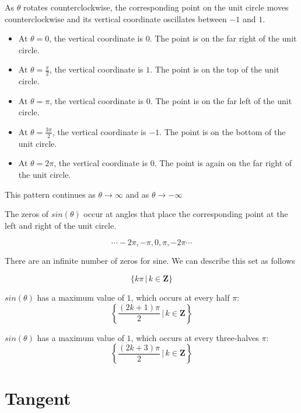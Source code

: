 \documentclass{ximera}
\begin{document}
As $\theta$ rotates counterclockwise, the corresponding point on the unit circle moves counterclockwise and its vertical coordinate oscillates between $-1$ and $1$.

\begin{itemize}
\item At $\theta = 0$, the vertical coordinate is $0$. The point is on the far right of the unit circle.
\item At $\theta = \frac{\pi}{2}$, the vertical coordinate is $1$. The point is on the top of the unit circle.
\item At $\theta = \pi$, the vertical coordinate is $0$. The point is on the far left of the unit circle.
\item At $\theta = \frac{3\pi}{2}$, the vertical coordinate is $-1$. The point is on the bottom of the unit circle.
\item At $\theta = 2\pi$, the vertical coordinate is $0$. The point is again on the far right of the unit circle.
\end{itemize}


This pattern continues as $\theta \rightarrow \infty$ and as $\theta \rightarrow -\infty$

The zeros of $sin(\theta)$ occur at angles that place the corresponding point at the left and right of the unit circle.  


\[     \cdots -2\pi, -\pi, 0, \pi, -2\pi \cdots \]


There are an infinite number of zeros for sine.  We can describe this set as follows


\[  \{  k \pi   \, | \, k \in \textbf{Z}   \}      \]





$sin(\theta)$ has a maximum value of $1$, which occurs at every half $\pi$:  
\[ \left\{  \frac{(2k+1)\pi}{2} \, | \, k \in \textbf{Z}\right\} \]



$sin(\theta)$ has a maximum value of $1$, which occurs at every three-halves $\pi$:  
\[ \left\{  \frac{(2k+3)\pi}{2} \, | \, k \in \textbf{Z}\right\} \]











\section{Tangent}
\end{document}
